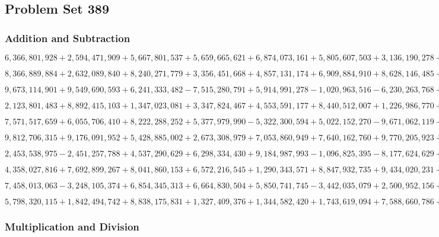 \hypertarget{problem-set-389}{%
\subsection{Problem Set 389}\label{problem-set-389}}

\hypertarget{addition-and-subtraction}{%
\subsubsection{Addition and
Subtraction}\label{addition-and-subtraction}}

\(6,366,801,928+2,594,471,909+5,667,801,537+5,659,665,621+6,874,073,161+5,805,607,503+3,136,190,278+8,401,198,699+5,099,731,791+8,255,002,954\)

\(8,366,889,884+2,632,089,840+8,240,271,779+3,356,451,668+4,857,131,174+6,909,884,910+8,628,146,485+9,152,567,243+3,446,020,436+8,642,419,221\)

\(9,673,114,901+9,549,690,593+6,241,333,482-7,515,280,791+5,914,991,278-1,020,963,516-6,230,263,768+6,843,025,972-1,875,545,577+9,519,988,562\)

\(2,123,801,483+8,892,415,103+1,347,023,081+3,347,824,467+4,553,591,177+8,440,512,007+1,226,986,770+2,391,221,398+1,864,139,071+9,154,087,397\)

\(7,571,517,659+6,055,706,410+8,222,288,252+5,377,979,990-5,322,300,594+5,022,152,270-9,671,062,119-7,757,383,929+6,388,182,462-2,202,883,161\)

\(9,812,706,315+9,176,091,952+5,428,885,002+2,673,308,979+7,053,860,949+7,640,162,760+9,770,205,923+8,784,091,801+3,136,810,032+4,367,903,883\)

\(2,453,538,975-2,451,257,788+4,537,290,629+6,298,334,430+9,184,987,993-1,096,825,395-8,177,624,629+2,949,787,065-5,404,058,460+4,195,934,579\)

\(4,358,027,816+7,692,899,267+8,041,860,153+6,572,216,545+1,290,343,571+8,847,932,735+9,434,020,231+2,212,331,466+4,543,664,725+5,901,082,231\)

\(7,458,013,063-3,248,105,374+6,854,345,313+6,664,830,504+5,850,741,745-3,442,035,079+2,500,952,156+3,698,481,813-6,407,151,423-5,311,992,721\)

\(5,798,320,115+1,842,494,742+8,838,175,831+1,327,409,376+1,344,582,420+1,743,619,094+7,588,660,786+9,109,496,994+3,616,858,231+5,781,338,742\)

\hypertarget{multiplication-and-division}{%
\subsubsection{Multiplication and
Division}\label{multiplication-and-division}}

